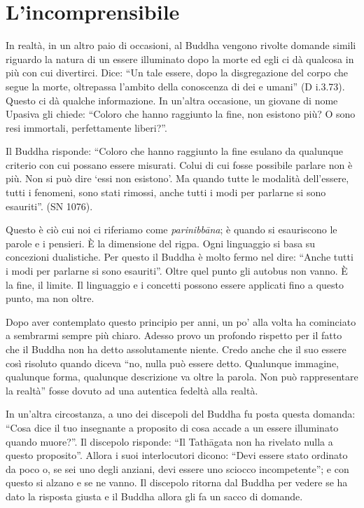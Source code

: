\section*{L'incomprensibile}

In realtà, in un altro paio di occasioni, al Buddha vengono rivolte domande simili riguardo la natura di un essere illuminato dopo la morte ed egli ci dà qualcosa in più con cui divertirci. Dice: ``Un tale essere, dopo la disgregazione del corpo che segue la morte, oltrepassa l'ambito della conoscenza di dei e umani'' (D i.3.73). Questo ci dà qualche informazione. In un'altra occasione, un giovane di nome Upasiva gli chiede: ``Coloro che hanno raggiunto la fine, non esistono più? O sono resi immortali, perfettamente liberi?''.

Il Buddha risponde: ``Coloro che hanno raggiunto la fine esulano da qualunque criterio con cui possano essere misurati. Colui di cui fosse possibile parlare non è più. Non si può dire `essi non esistono'. Ma quando tutte le modalità dell'essere, tutti i fenomeni, sono stati rimossi, anche tutti i modi per parlarne si sono esauriti''. (SN 1076).

Questo è ciò cui noi ci riferiamo come \textit{parinibbāna}; è quando si esauriscono le parole e i pensieri. È la dimensione del rigpa. Ogni linguaggio si basa su concezioni dualistiche. Per questo il Buddha è molto fermo nel dire: ``Anche tutti i modi per parlarne si sono esauriti''. Oltre quel punto gli autobus non vanno. È la fine, il limite. Il linguaggio e i concetti possono essere applicati fino a questo punto, ma non oltre. 

Dopo aver contemplato questo principio per anni, un po' alla volta ha cominciato a sembrarmi sempre più chiaro. Adesso provo un profondo rispetto per il fatto che il Buddha non ha detto assolutamente niente. Credo anche che il suo essere così risoluto quando diceva ``no, nulla può essere detto. Qualunque immagine, qualunque forma, qualunque descrizione va oltre la parola. Non può rappresentare la realtà'' fosse dovuto ad una autentica fedeltà alla realtà.

In un'altra circostanza, a uno dei discepoli del Buddha fu posta questa domanda: ``Cosa dice il tuo insegnante a proposito di cosa accade a un essere illuminato quando muore?''. Il discepolo risponde: ``Il Tathāgata non ha rivelato nulla a questo proposito''. Allora i suoi interlocutori dicono: ``Devi essere stato ordinato da poco o, se sei uno degli anziani, devi essere uno sciocco incompetente''; e con questo si alzano e se ne vanno. Il discepolo ritorna dal Buddha per vedere se ha dato la risposta giusta e il Buddha allora gli fa un sacco di domande.

